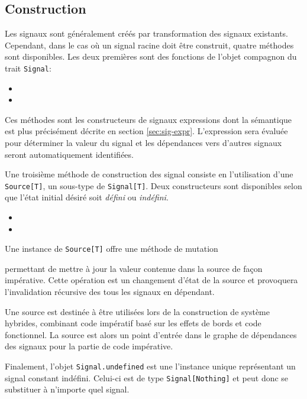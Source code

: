 \subsection{Construction}

Les signaux sont généralement créés par transformation des signaux existants. Cependant, dans le cas où un signal racine doit être construit, quatre méthodes sont disponibles. Les deux premières sont des fonctions de l'objet compagnon du trait \texttt{Signal}:

\begin{itemize}
	\item {}
	\item {}
\end{itemize}

Ces méthodes sont les constructeurs de signaux expressions dont la sémantique est plus précisément décrite en section \ref{sec:sig-expr}. L'expression sera évaluée pour déterminer la valeur du signal et les dépendances vers d'autres signaux seront automatiquement identifiées.

Une troisième méthode de construction des signal consiste en l'utilisation d'une \texttt{Source[T]}, un sous-type de \texttt{Signal[T]}. Deux constructeurs sont disponibles selon que l'état initial désiré soit \emph{défini} ou \emph{indéfini}.

\begin{itemize}
	\item {}
	\item {}
\end{itemize}

Une instance de \texttt{Source[T]} offre une méthode de mutation
\begin{center}
\end{center}
permettant de mettre à jour la valeur contenue dans la source de façon impérative. Cette opération est un changement d'état de la source et provoquera l'invalidation récursive des tous les signaux en dépendant.

Une source est destinée à être utilisées lors de la construction de système hybrides, combinant code impératif basé sur les effets de bords et code fonctionnel. La source est alors un point d'entrée dans le graphe de dépendances des signaux pour la partie de code impérative.

Finalement, l'objet \texttt{Signal.undefined} est une l'instance unique représentant un signal constant indéfini. Celui-ci est de type \texttt{Signal[Nothing]} et peut donc se substituer à n'importe quel signal.

